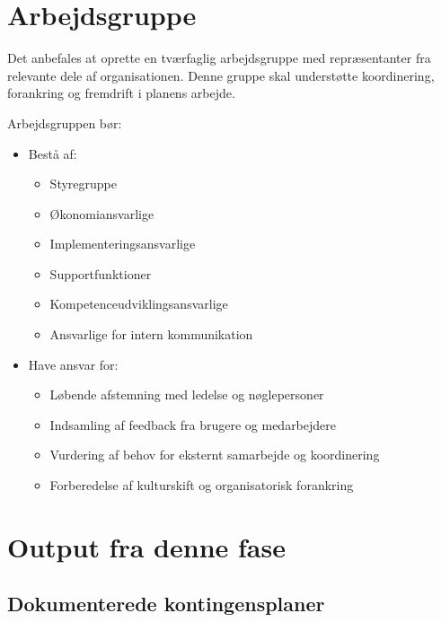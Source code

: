 \documentclass[a4paper,11pt,oneside]{book}
\def\tightlist{}
\begin{document}
\section{Arbejdsgruppe}\label{arbejdsgruppe}

Det anbefales at oprette en tværfaglig arbejdsgruppe med repræsentanter
fra relevante dele af organisationen. Denne gruppe skal understøtte
koordinering, forankring og fremdrift i planens arbejde.

Arbejdsgruppen bør:

\begin{itemize}
\item
  Bestå af:

  \begin{itemize}
  \tightlist
  \item
    Styregruppe
  \item
    Økonomiansvarlige
  \item
    Implementeringsansvarlige
  \item
    Supportfunktioner
  \item
    Kompetenceudviklingsansvarlige
  \item
    Ansvarlige for intern kommunikation
  \end{itemize}
\item
  Have ansvar for:

  \begin{itemize}
  \tightlist
  \item
    Løbende afstemning med ledelse og nøglepersoner
  \item
    Indsamling af feedback fra brugere og medarbejdere
  \item
    Vurdering af behov for eksternt samarbejde og koordinering
  \item
    Forberedelse af kulturskift og organisatorisk forankring
  \end{itemize}
\end{itemize}

\section{Output fra denne fase}\label{output-fra-denne-fase}

\subsection{Dokumenterede
kontingensplaner}\label{dokumenterede-kontingensplaner}
\end{document}
